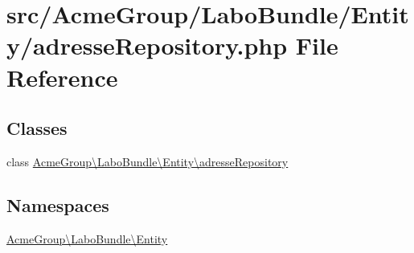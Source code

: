 \hypertarget{adresse_repository_8php}{\section{src/\+Acme\+Group/\+Labo\+Bundle/\+Entity/adresse\+Repository.php File Reference}
\label{adresse_repository_8php}
}
\subsection*{Classes}
\begin{DoxyCompactItemize}
\item 
class \hyperlink{class_acme_group_1_1_labo_bundle_1_1_entity_1_1adresse_repository}{Acme\+Group\textbackslash{}\+Labo\+Bundle\textbackslash{}\+Entity\textbackslash{}adresse\+Repository}
\end{DoxyCompactItemize}
\subsection*{Namespaces}
\begin{DoxyCompactItemize}
\item 
 \hyperlink{namespace_acme_group_1_1_labo_bundle_1_1_entity}{Acme\+Group\textbackslash{}\+Labo\+Bundle\textbackslash{}\+Entity}
\end{DoxyCompactItemize}
